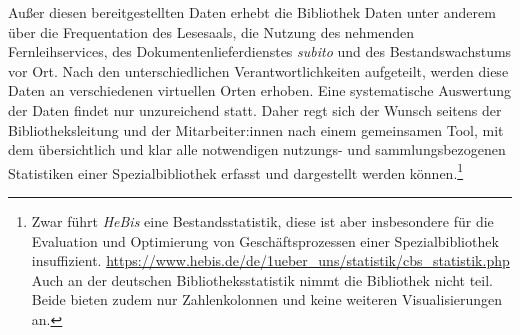 Außer diesen bereitgestellten Daten erhebt die Bibliothek Daten unter anderem über
die Frequentation des Lesesaals, die Nutzung des nehmenden Fernleihservices, des
Dokumentenlieferdienstes \textit{subito} und des Bestandswachstums vor Ort.
Nach den unterschiedlichen Verantwortlichkeiten aufgeteilt, werden diese Daten an verschiedenen virtuellen Orten erhoben.
Eine systematische Auswertung der Daten findet nur unzureichend statt.
Daher regt sich der Wunsch seitens der Bibliotheksleitung und der Mitarbeiter:innen nach einem gemeinsamen Tool,
mit dem übersichtlich und klar alle notwendigen nutzungs- und sammlungsbezogenen Statistiken einer
Spezialbibliothek erfasst und dargestellt werden können.\footnote{Zwar führt \textit{HeBis} eine Bestandsstatistik, diese ist aber insbesondere für die
Evaluation und Optimierung von Geschäftsprozessen einer Spezialbibliothek
insuffizient. \url{https://www.hebis.de/de/1ueber_uns/statistik/cbs_statistik.php} 
Auch an der deutschen Bibliotheksstatistik nimmt die Bibliothek nicht teil. Beide bieten zudem nur Zahlenkolonnen und keine weiteren Visualisierungen an.}

